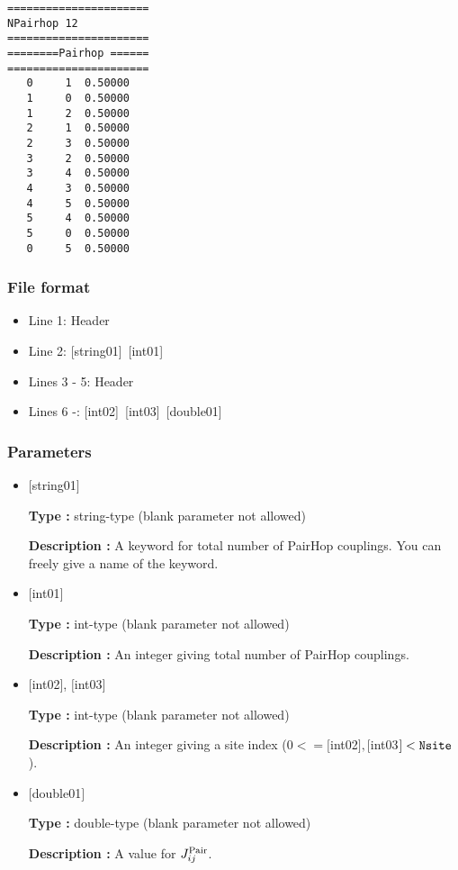 \begin{minipage}{12.5cm}
\begin{screen}
\begin{verbatim}
====================== 
NPairhop 12  
====================== 
========Pairhop ====== 
====================== 
   0     1  0.50000
   1     0  0.50000  
   1     2  0.50000
   2     1  0.50000
   2     3  0.50000
   3     2  0.50000
   3     4  0.50000
   4     3  0.50000
   4     5  0.50000
   5     4  0.50000
   5     0  0.50000
   0     5  0.50000
\end{verbatim}
\end{screen}
\end{minipage}

\subsubsection{File format}
 \begin{itemize}
   \item  Line 1:  Header
   \item  Line 2:   [string01]~[int01]
   \item  Lines 3 - 5:  Header
   \item  Lines 6 -: 
   [int02]~[int03]~[double01] 
  \end{itemize}
\subsubsection{Parameters}
 \begin{itemize}

   \item  $[$string01$]$
   
    {\bf Type :} string-type (blank parameter not allowed)

   {\bf Description :} A keyword for total number of PairHop couplings. You can freely give a name of the keyword.

   \item  $[$int01$]$
   
    {\bf Type :} int-type (blank parameter not allowed)

   {\bf Description :}  An integer giving total number of PairHop couplings.

  \item  $[$int02$]$, $[$int03$]$
  
 {\bf Type :} int-type (blank parameter not allowed)

{\bf Description :} An integer giving a site index ($0<= [$int02$], [$int03$]<\verb|Nsite|$).
 
 \item  $[$double01$]$
   
   {\bf Type :} double-type (blank parameter not allowed)

  {\bf Description :}   A value for $J_{ij}^{\rm Pair}$.
  
\end{itemize}

